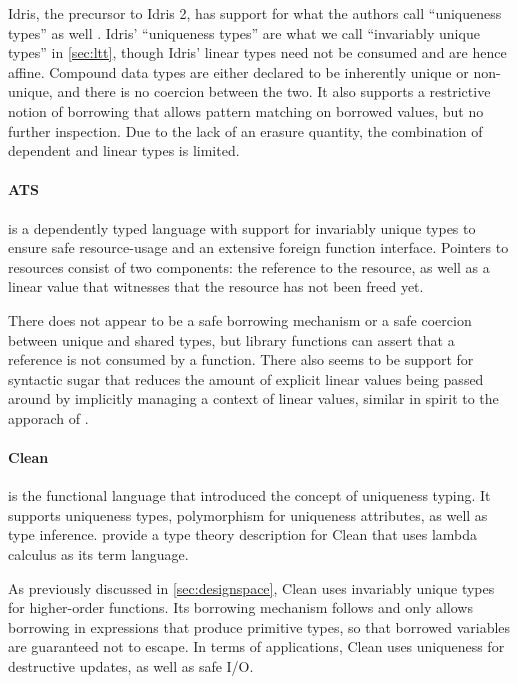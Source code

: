 Idris, the precursor to Idris 2, has support for what the authors call ``uniqueness types'' as well \citep{brady_type_2017}. Idris' ``uniqueness types'' are what we call ``invariably unique types'' in \cref{sec:ltt}, though Idris' linear types need not be consumed and are hence affine. Compound data types are either declared to be inherently unique or non-unique, and there is no coercion between the two. It also supports a restrictive notion of borrowing that allows pattern matching on borrowed values, but no further inspection. Due to the lack of an erasure quantity, the combination of dependent and linear types is limited.

\paragraph{ATS} \citep{shi_linear_2013} is a dependently typed language with support for invariably unique types to ensure safe resource-usage and an extensive foreign function interface. Pointers to resources consist of two components: the reference to the resource, as well as a linear value that witnesses that the resource has not been freed yet. 

There does not appear to be a safe borrowing mechanism or a safe coercion between unique and shared types, but library functions can assert that a reference is not consumed by a function. There also seems to be support for syntactic sugar that reduces the amount of explicit linear values being passed around by implicitly managing a context of linear values, similar in spirit to the apporach of \cite{spiwack_linearly_2022}.

\paragraph{Clean} \citep{smetsers_guaranteeing_1994} is the functional language that introduced the concept of uniqueness typing. It supports uniqueness types, polymorphism for uniqueness attributes, as well as type inference. \cite{vries_making_2009} provide a type theory description for Clean that uses lambda calculus as its term language. 

As previously discussed in \cref{sec:designspace}, Clean uses invariably unique types for higher-order functions. Its borrowing mechanism follows \cite{wadler_linear_1990} and only allows borrowing in expressions that produce primitive types, so that borrowed variables are guaranteed not to escape. In terms of applications, Clean uses uniqueness for destructive updates, as well as safe I/O.

